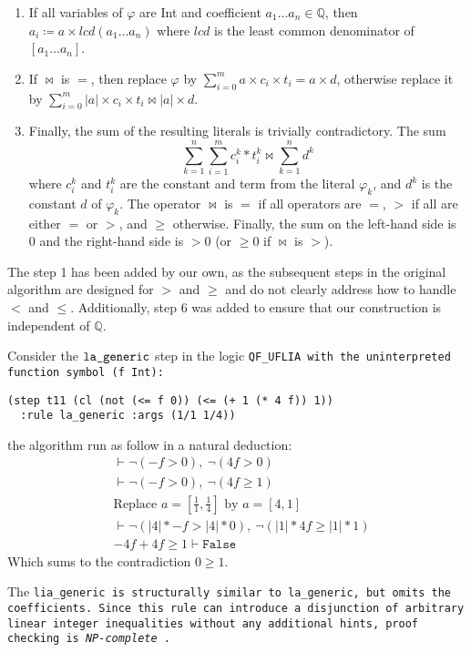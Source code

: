 \begin{enumerate}
    \item If all variables of $\varphi$ are Int and coefficient $a_1 \dots a_n \in \mathbb{Q}$,
    then $a_i \coloneq a \times \mathit{lcd}(a_1 \dots a_n)$ where $\mathit{lcd}$ is the least common denominator of $[a_1 \dots a_n]$.
    
    \item If $\bowtie$ is $=$, then replace $\varphi$ by
    $\sum_{i=0}^{m}a\times{}c_i\times{}t_i = a\times{}d$, otherwise replace it by
    $\sum_{i=0}^{m}|a|\times{}c_i\times{}t_i \bowtie |a|\times{}d$.

    \item Finally, the sum of the resulting literals is trivially contradictory.
    The sum
    \[
        \sum_{k=1}^{n}\sum_{i=1}^{m}c_i^k*t_i^k \bowtie \sum_{k=1}^{n}d^k
    \]
  where $c_i^k$ and $t_i^k$ are the constant and term from the literal $\varphi_k$, and $d^k$ is the constant $d$ of $\varphi_k$.
  The operator $\bowtie$ is $=$ if all operators are $=$, $>$ if all are either $=$ or $>$, and $\geq$ otherwise. Finally, the sum on the left-hand side is $0$ and the right-hand side is $>0$ (or $\geq 0$ if $\bowtie$ is $>$).

\end{enumerate}

The step 1 has been added by our own, as the subsequent steps in the original algorithm are designed for $>$ and $\geq$ and do not clearly address how to handle $<$ and $\leq$.
Additionally, step 6  was added to ensure that our construction is independent of $\mathbb{Q}$.

\begin{example}
Consider the $\tt{la\_generic}$ step in the logic \tt{QF\_UFLIA} with the uninterpreted function symbol \lstinline[language=SMT,basicstyle=\ttfamily\footnotesize\upshape]|(f Int)|:
\begin{lstlisting}[language=SMT,label={lst:smtexampleinput}]
(step t11 (cl (not (<= f 0)) (<= (+ 1 (* 4 f)) 1))
  :rule la_generic :args (1/1 1/4))
\end{lstlisting} the algorithm run as follow in a natural deduction:
\begin{align}
&\vdash \neg (- f > 0),~ \neg(4f > 0) \label{eq:step2}\tag{Step 2}\\
&\vdash \neg (- f > 0),~ \neg(4f \geq 1) \label{eq:step3}\tag{Step 3}\\
&\text{Replace } a = [\frac{1}{1}, \frac{1}{4}] \text{ by } a = [4, 1] \label{eq:step4}\tag{Step 4}\\
&\vdash \neg (|4| * - f > |4| * 0 ), ~ \neg(|1| * 4f \geq |1| * 1) \label{eq:step5}\tag{Step 5} \\
&-4f + 4f \geq 1 \vdash \mathtt{False} \label{eq:step6}\tag{Step 6}
\end{align}
Which sums to the contradiction  $0 \geq 1$.
\label{ex:la_generic_example_red}
\end{example}

The \tt{lia\_generic} is structurally similar to \tt{la\_generic}, but omits the coefficients.
Since this rule can introduce a disjunction of arbitrary linear integer inequalities without any additional hints, proof checking is \emph{NP-complete} \cite{Schrijver:lia}.